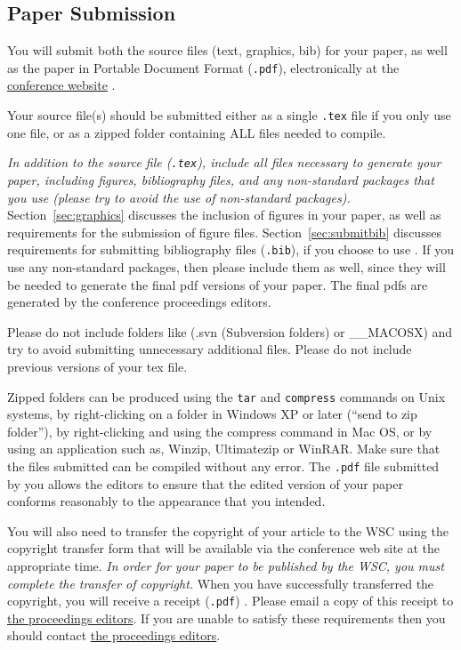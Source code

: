 \documentclass{wscpaperproc}
\theoremstyle{wsc}
\begin{document}
\subsection{Paper Submission}
You will submit both the source files (text, graphics, bib) for your paper, as well as the paper in Portable Document Format ({\tt .pdf}), electronically at the \href{http://www.wintersim.org}{conference website} \cite{WSC}.

Your source file(s) should be submitted either as a single {\tt .tex} file if you only use
one file, or as a zipped folder containing ALL files needed to compile.

{\em In addition to the source file ({\tt .tex}), include all files necessary to generate your paper, including figures, bibliography files, and any non-standard packages that you use (please try to avoid the use of non-standard packages).} Section~\ref{sec:graphics} discusses the inclusion of figures in your paper, as well as requirements for the submission of figure files.
Section~\ref{sec:submitbib} discusses requirements for submitting bibliography files ({\tt .bib}), if you choose to use \BibTeX. If you use any non-standard packages, then please include them as well, since they will be needed to generate the final pdf versions of your paper.
The final pdfs are generated by the conference proceedings editors.

Please do not include folders like (.svn (Subversion folders) or \_\_MACOSX) and try to avoid submitting unnecessary additional files.
Please do not include previous versions of your tex file.

Zipped folders can be
produced using the {\tt tar} and {\tt compress} commands on Unix systems, by right-clicking on
a folder in Windows XP or later (``send to zip folder''), by right-clicking and using the compress command in Mac OS, or by using an application such as,
Winzip, Ultimatezip or WinRAR.
Make sure that the files submitted can be compiled without any error.
The {\tt .pdf} file submitted by you allows the editors to ensure that the edited version of your paper conforms reasonably to the appearance
that you intended.

You will also need to transfer the copyright of your article to the WSC using the copyright transfer form that will be available via the conference web site at the appropriate time. {\em In order for your paper to be published by the WSC, you must complete the transfer of copyright.}
When you have successfully transferred the copyright, you will receive a receipt ({\tt .pdf}) .
Please email a copy of this receipt to \href{mailto://wsc14proceedings@gmail.com}{the proceedings editors}. If you are unable to satisfy these requirements then you should contact \href{mailto://wsc14proceedings@gmail.com}{the proceedings editors}.
\end{document}
